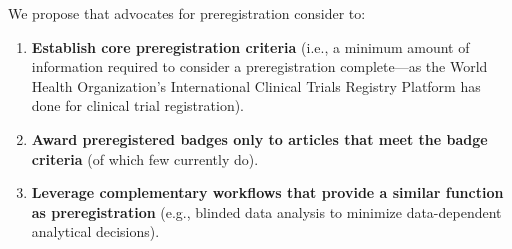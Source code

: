 \documentclass[authordate, meta, issue]{jote-new-article}
\begin{document}
We propose that advocates for preregistration consider to:

\begin{fullwidth}
  \begin{enumerate}[leftmargin=!,itemindent=0pt]

    \item \textbf{Establish core preregistration criteria }(i.e., a minimum amount of information required to consider a preregistration complete—as the World Health Organization’s International Clinical Trials Registry Platform has done for clinical trial registration).


    \item \textbf{Award preregistered badges only to articles that meet the badge criteria }(of which few currently do).


    \item \textbf{Leverage complementary workflows that provide a similar function as preregistration }(e.g., blinded data analysis to minimize data-dependent analytical decisions).


  \end{enumerate}
\end{fullwidth}
\end{document}
